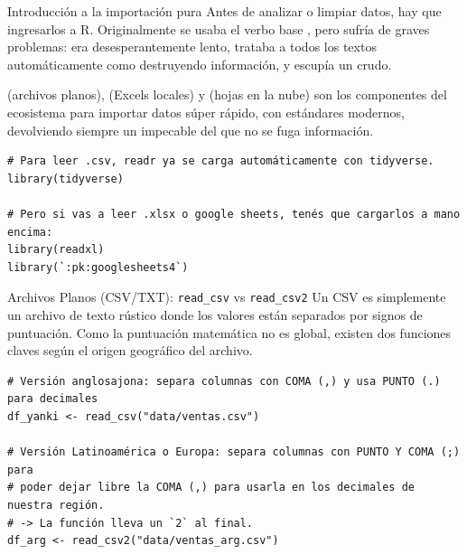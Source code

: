 \documentclass[8pt]{beamer}
\begin{document}
	\subtitle{Cheatsheet de Importación (\texttt{readr}, \texttt{readxl}, \texttt{googlesheets4})}

	\begin{frame}[plain]
		\maketitle
	\end{frame}

	\begin{frame}[fragile]{Introducción a la importación pura}
		Antes de analizar o limpiar datos, hay que ingresarlos a R. Originalmente se usaba el verbo base , pero sufría de graves problemas: era desesperantemente lento, trataba a todos los textos automáticamente como  destruyendo información, y escupía un  crudo.
		
		\begin{exampleblock}{}
			 (archivos planos),  (Excels locales) y  (hojas en la nube) son los componentes del ecosistema  para importar datos súper rápido, con estándares modernos, devolviendo siempre un  impecable del que no se fuga información.
		\end{exampleblock}

\begin{lstlisting}[style=RScript]
# Para leer .csv, readr ya se carga automáticamente con tidyverse.
library(tidyverse)

# Pero si vas a leer .xlsx o google sheets, tenés que cargarlos a mano encima:
library(readxl)
library(`:pk:googlesheets4`)
\end{lstlisting}
	\end{frame}

	\begin{frame}[fragile]{Archivos Planos (CSV/TXT): \texttt{read\_csv} vs \texttt{read\_csv2}}
		Un CSV es simplemente un archivo de texto rústico donde los valores están separados por signos de puntuación. Como la puntuación matemática no es global, existen dos funciones claves según el origen geográfico del archivo.
		
\begin{lstlisting}[style=RScript]
# Versión anglosajona: separa columnas con COMA (,) y usa PUNTO (.) para decimales
df_yanki <- read_csv("data/ventas.csv")

# Versión Latinoamérica o Europa: separa columnas con PUNTO Y COMA (;) para
# poder dejar libre la COMA (,) para usarla en los decimales de nuestra región.
# -> La función lleva un `2` al final.
df_arg <- read_csv2("data/ventas_arg.csv")
\end{lstlisting}
	\end{frame}
\end{document}
